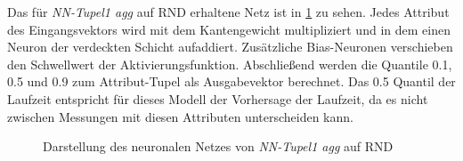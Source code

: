 \documentclass[
	12pt,
	a4paper,
	BCOR10mm,
	DIV14,
	listof=totoc,
	bibliography=totoc,
	headsepline
]{scrreprt}
\begin{document}
Das für \textit{NN-Tupel1 agg} auf RND erhaltene Netz ist in \ref{fig:agg_net} zu sehen.
Jedes Attribut des Eingangsvektors wird mit dem Kantengewicht multipliziert und in dem einen Neuron der verdeckten Schicht aufaddiert. Zusätzliche Bias-Neuronen verschieben den Schwellwert der Aktivierungsfunktion.
Abschließend werden die Quantile 0.1, 0.5 und 0.9 zum Attribut-Tupel als Ausgabevektor berechnet. Das 0.5 Quantil der Laufzeit entspricht für dieses Modell der Vorhersage der Laufzeit, da es nicht zwischen Messungen mit diesen Attributen unterscheiden kann.\medskip

\begin{figure}
	\centering
	\caption{Darstellung des neuronalen Netzes von \textit{NN-Tupel1 agg} auf RND}
	\label{fig:agg_net}
\end{figure} 
\end{document}
